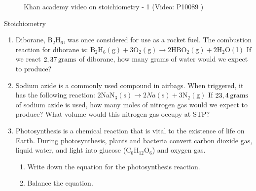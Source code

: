 \label{m38712*eip-546}
    \setcounter{subfigure}{0}
	\begin{figure}[H] %
    \textnormal{Khan academy video on stoichiometry - 1} \nopagebreak
  \label{m38712*yt-media4}\label{m38712*yt-video4}
             { (Video:  P10089 )}
 \end{figure}       \par \label{m38712*secfhsst!!!underscore!!!id2276}
    \noindent
            \begin{exercises}{  Stoichiometry
      }
            \nopagebreak \noindent
      \label{m38712*id285393}\begin{enumerate}[noitemsep, label=\textbf{\arabic*}. ] 
            \label{m38712*uid101}\item Diborane, $\text{B}{}_{2}\text{H}{}_{6}$, was once considered for use as a rocket fuel. The combustion reaction for diborane is:
${\text{B}}_{2}{\text{H}}_{6}\left(\text{g}\right)+3{\text{O}}_{2}\left(\text{g}\right)\to 2\text{H}\text{B}{\text{O}}_{2}\left(\text{g}\right)+2{\text{H}}_{2}\text{O}\left(\text{l}\right)$
If we react $2,37\phantom{\rule{2pt}{0ex}}\text{grams}$ of diborane, how many grams of water would we expect to produce?\newline
\label{m38712*uid102}\item Sodium azide is a commonly used compound in airbags. When triggered, it has the following reaction:
$2{\text{NaN}}_{3}\left(\text{s}\right)\to 2Na\left(\text{s}\right)+3{\text{N}}_{2}\left(\text{g}\right)$
If $23,4\phantom{\rule{2pt}{0ex}}\text{grams}$ of sodium azide is used, how many moles of nitrogen gas would we expect to produce? What volume would this nitrogen gas occupy at STP?\newline
\label{m38712*uid103}\item Photosynthesis is a chemical reaction that is vital to the existence of life on Earth. During photosynthesis, plants and bacteria convert carbon dioxide gas, liquid water, and light into glucose ($\text{C}{}_{6}\text{H}{}_{12}\text{O}{}_{6}$) and oxygen gas.
\label{m38712*id285674}\begin{enumerate}[noitemsep, label=\textbf{\alph*}. ] 
            \label{m38712*uid104}\item Write down the equation for the photosynthesis reaction.
\label{m38712*uid105}\item Balance the equation.

\end{enumerate}
\end{enumerate}
\end{exercises}

